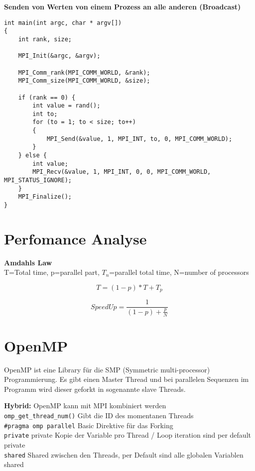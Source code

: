 \textbf{Senden von Werten von einem Prozess an alle anderen (Broadcast)}
\begin{lstlisting}[style=csharp]
int main(int argc, char * argv[]) 
{
    int rank, size;
    
    MPI_Init(&argc, &argv);

    MPI_Comm_rank(MPI_COMM_WORLD, &rank);
    MPI_Comm_size(MPI_COMM_WORLD, &size);

    if (rank == 0) {
        int value = rand();
        int to;
        for (to = 1; to < size; to++)
        {
            MPI_Send(&value, 1, MPI_INT, to, 0, MPI_COMM_WORLD);
        } 
    } else {
        int value;
        MPI_Recv(&value, 1, MPI_INT, 0, 0, MPI_COMM_WORLD, MPI_STATUS_IGNORE);
    }
    MPI_Finalize();
}
\end{lstlisting}

\section{Perfomance Analyse}
	\textbf{Amdahls Law} \\
	T=Total time, p=parallel part, $T_n$=parallel total time, N=number of processors  \\
\begin{minipage}[t]{0.5\linewidth}
	\[ T = (1-p) * T + T_p \]
\end{minipage}
\begin{minipage}[t]{0.5\linewidth}
	\[ SpeedUp = \frac{1}{(1-p) + \frac{p}{N}} \]
\end{minipage}

\section{OpenMP}
OpenMP ist eine Library für die SMP (Symmetric multi-processor) Programmierung. Es gibt einen Master Thread und bei parallelen Sequenzen im Programm wird dieser geforkt in sogenannte slave Threads.

\textbf{Hybrid:} OpenMP kann mit MPI kombiniert werden \\
\lstinline|omp_get_thread_num()| Gibt die ID des momentanen Threads \\
\lstinline|#pragma omp parallel| Basic Direktive für das Forking \\
\lstinline|private| private Kopie der Variable pro Thread / Loop iteration sind per default private \\
\lstinline|shared| Shared zwischen den Threads, per Default sind alle globalen Variablen shared 

